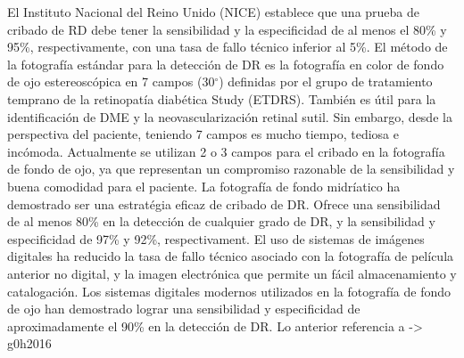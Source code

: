 El Instituto Nacional del Reino Unido (NICE) establece que una prueba de cribado de RD debe tener la sensibilidad y la especificidad de al menos el 80\% y 95\%, respectivamente, con una tasa de fallo t\'ecnico inferior al 5\%. El m\'etodo de la fotograf\'ia est\'andar para la detecci\'on de DR es la fotograf\'ia en color de fondo de ojo estereosc\'opica en 7 campos (30$^{\circ}$) definidas por el grupo de tratamiento temprano de la retinopat\'ia diab\'etica Study (ETDRS). También es \'util para la identificaci\'on de DME y la neovascularizaci\'on retinal sutil. Sin embargo, desde la perspectiva del paciente, teniendo 7 campos es mucho tiempo, tediosa e inc\'omoda.
Actualmente se utilizan  2 o 3 campos para el cribado en la fotograf\'ia de fondo de ojo, ya que representan un compromiso razonable de la sensibilidad y buena  comodidad para el paciente.
La fotograf\'ia de fondo midr\'iatico ha demostrado ser una estrat\'egia eficaz de cribado de DR. Ofrece una sensibilidad de al menos 80\% en la detecci\'on de cualquier grado de DR, y la sensibilidad y especificidad de 97\% y 92\%, respectivament.
El uso de sistemas de im\'agenes digitales ha reducido la tasa de fallo t\'ecnico asociado con la fotograf\'ia de pel\'icula anterior no digital, y la imagen electr\'onica que permite un f\'acil almacenamiento y catalogaci\'on. Los sistemas digitales modernos utilizados en la fotograf\'ia de fondo de ojo han demostrado lograr una sensibilidad y especificidad de aproximadamente el 90\% en la detecci\'on de DR.
Lo anterior referencia a -> g0h2016



